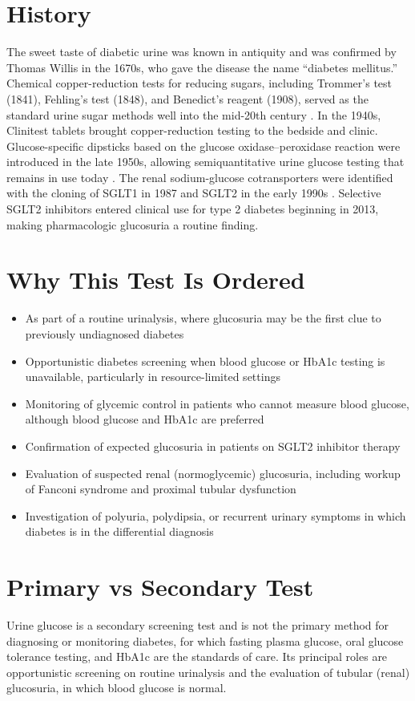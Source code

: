 \section*{History}
The sweet taste of diabetic urine was known in antiquity and was confirmed by Thomas Willis in the 1670s, who gave the disease the name ``diabetes mellitus.'' Chemical copper-reduction tests for reducing sugars, including Trommer's test (1841), Fehling's test (1848), and Benedict's reagent (1908), served as the standard urine sugar methods well into the mid-20th century \cite{benedict1909reagent}. In the 1940s, Clinitest tablets brought copper-reduction testing to the bedside and clinic. Glucose-specific dipsticks based on the glucose oxidase--peroxidase reaction were introduced in the late 1950s, allowing semiquantitative urine glucose testing that remains in use today \cite{free1957simple}. The renal sodium-glucose cotransporters were identified with the cloning of SGLT1 in 1987 and SGLT2 in the early 1990s \cite{wright2011biology}. Selective SGLT2 inhibitors entered clinical use for type 2 diabetes beginning in 2013, making pharmacologic glucosuria a routine finding.
\section*{Why This Test Is Ordered}
\begin{itemize}
  \item As part of a routine urinalysis, where glucosuria may be the first clue to previously undiagnosed diabetes
  \item Opportunistic diabetes screening when blood glucose or HbA1c testing is unavailable, particularly in resource-limited settings
  \item Monitoring of glycemic control in patients who cannot measure blood glucose, although blood glucose and HbA1c are preferred
  \item Confirmation of expected glucosuria in patients on SGLT2 inhibitor therapy
  \item Evaluation of suspected renal (normoglycemic) glucosuria, including workup of Fanconi syndrome and proximal tubular dysfunction
  \item Investigation of polyuria, polydipsia, or recurrent urinary symptoms in which diabetes is in the differential diagnosis
\end{itemize}
\section*{Primary vs Secondary Test}
Urine glucose is a secondary screening test and is not the primary method for diagnosing or monitoring diabetes, for which fasting plasma glucose, oral glucose tolerance testing, and HbA1c are the standards of care. Its principal roles are opportunistic screening on routine urinalysis and the evaluation of tubular (renal) glucosuria, in which blood glucose is normal.
